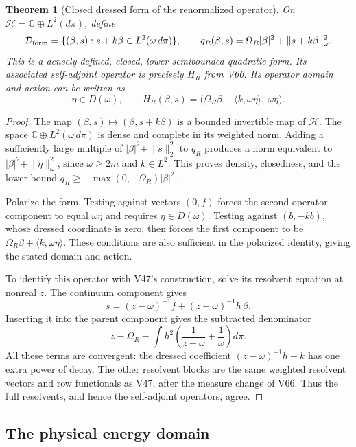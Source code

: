 \documentclass[11pt]{article}
\newtheorem{theorem}{Theorem}[section]
\theoremstyle{remark}
\begin{document}
\begin{theorem}[Closed dressed form of the renormalized operator]
\label{thm:v20v67-form}
On \(\mathcal H=\mathbb C\oplus L^2(d\pi)\), define
\[
 \mathcal D_{\rm form}=
       \{(\beta,s):s+k\beta\in L^2(\omega\,d\pi)\},\qquad
 q_R(\beta,s)=\Omega_R|\beta|^2+\|s+k\beta\|_\omega^2 .
\]
This is a densely defined, closed, lower-semibounded
quadratic form.  Its associated self-adjoint operator
is precisely \(H_R\) from V66.
Its operator domain and action can be written as
\[
 \eta\in D(\omega),\qquad
 H_R(\beta,s)=
       \big(\Omega_R\beta+\langle k,\omega\eta\rangle,\
                                                  \omega\eta\big).
\]
\end{theorem}
\begin{proof}
The map \((\beta,s)\mapsto(\beta,s+k\beta)\) is a bounded
invertible map of \(\mathcal H\).
The space \(\mathbb C\oplus L^2(\omega\,d\pi)\) is dense
and complete in its weighted norm.  Adding a sufficiently
large multiple of \(|\beta|^2+\|s\|_2^2\) to \(q_R\)
produces a norm equivalent to
\(|\beta|^2+\|\eta\|_\omega^2\), since \(\omega\geq2m\)
and \(k\in L^2\).  This proves density, closedness, and
the lower bound \(q_R\geq-\max(0,-\Omega_R)|\beta|^2\).

Polarize the form.  Testing against vectors \((0,f)\)
forces the second operator component to equal \(\omega\eta\)
and requires \(\eta\in D(\omega)\).
Testing against \((b,-kb)\), whose dressed coordinate is
zero, then forces the first component to be
\(\Omega_R\beta+\langle k,\omega\eta\rangle\).
These conditions are also sufficient in the polarized
identity, giving the stated domain and action.

To identify this operator with V47's construction, solve
its resolvent equation at nonreal \(z\).
The continuum component gives
\[
 s=(z-\omega)^{-1}f+(z-\omega)^{-1}h\,\beta .
\]
Inserting it into the parent component gives the
subtracted denominator
\[
 z-\Omega_R-
      \int h^2\left(\frac1{z-\omega}+\frac1\omega\right)d\pi.
\]
All these terms are convergent: the dressed coefficient
\((z-\omega)^{-1}h+k\) has one extra power of decay.
The other resolvent blocks are the same weighted
resolvent vectors and row functionals as V47, after
the measure change of V66.  Thus the full resolvents,
and hence the self-adjoint operators, agree.
\end{proof}

\subsection{The physical energy domain}
\end{document}
